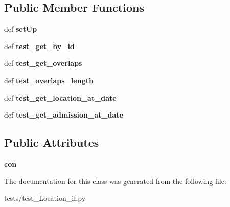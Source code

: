 \subsection*{Public Member Functions}
\begin{DoxyCompactItemize}
\item 
\hypertarget{classtests_1_1test___location__if_1_1_location_i_f_tests_a4a33334f7d423b4b8811b642ab7bdcb8}{def {\bfseries set\-Up}}\label{classtests_1_1test___location__if_1_1_location_i_f_tests_a4a33334f7d423b4b8811b642ab7bdcb8}

\item 
\hypertarget{classtests_1_1test___location__if_1_1_location_i_f_tests_af4b51ebb1fc030efb6082c25a17d528a}{def {\bfseries test\-\_\-get\-\_\-by\-\_\-id}}\label{classtests_1_1test___location__if_1_1_location_i_f_tests_af4b51ebb1fc030efb6082c25a17d528a}

\item 
\hypertarget{classtests_1_1test___location__if_1_1_location_i_f_tests_a925b32e83c74e1c3b5c94801c2a907b0}{def {\bfseries test\-\_\-get\-\_\-overlaps}}\label{classtests_1_1test___location__if_1_1_location_i_f_tests_a925b32e83c74e1c3b5c94801c2a907b0}

\item 
\hypertarget{classtests_1_1test___location__if_1_1_location_i_f_tests_a324c8790c20d44e3b6c73c94e6ec7807}{def {\bfseries test\-\_\-overlaps\-\_\-length}}\label{classtests_1_1test___location__if_1_1_location_i_f_tests_a324c8790c20d44e3b6c73c94e6ec7807}

\item 
\hypertarget{classtests_1_1test___location__if_1_1_location_i_f_tests_a448ec5e5fe858118cd039a74fae172e9}{def {\bfseries test\-\_\-get\-\_\-location\-\_\-at\-\_\-date}}\label{classtests_1_1test___location__if_1_1_location_i_f_tests_a448ec5e5fe858118cd039a74fae172e9}

\item 
\hypertarget{classtests_1_1test___location__if_1_1_location_i_f_tests_a0cc4d7b37570f43acecdc226345e710b}{def {\bfseries test\-\_\-get\-\_\-admission\-\_\-at\-\_\-date}}\label{classtests_1_1test___location__if_1_1_location_i_f_tests_a0cc4d7b37570f43acecdc226345e710b}

\end{DoxyCompactItemize}
\subsection*{Public Attributes}
\begin{DoxyCompactItemize}
\item 
\hypertarget{classtests_1_1test___location__if_1_1_location_i_f_tests_ad91d9ec3b9bbcb933c91aed032f2f7e9}{{\bfseries con}}\label{classtests_1_1test___location__if_1_1_location_i_f_tests_ad91d9ec3b9bbcb933c91aed032f2f7e9}

\end{DoxyCompactItemize}


The documentation for this class was generated from the following file\-:\begin{DoxyCompactItemize}
\item 
tests/test\-\_\-\-Location\-\_\-if.\-py\end{DoxyCompactItemize}
